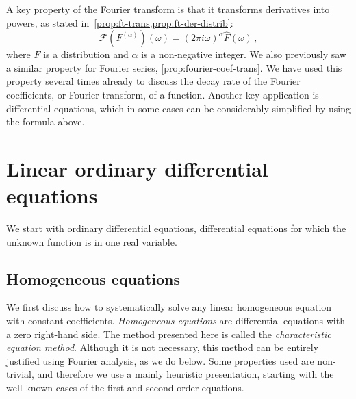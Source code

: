 A key property of the Fourier transform is that it transforms derivatives into powers, as
stated in~\cref{prop:ft-trans,prop:ft-der-distrib}:
\begin{equation}
  \mathcal{F}(F^{(\alpha)})(\omega)=(2\pi i\omega)^{\alpha}\hat{F}(\omega)\,,
\end{equation}
where $F$ is a distribution and $\alpha$ is a non-negative integer. We also previously saw
a similar property for Fourier series, \cf\cref{prop:fourier-coef-trans}. We have used this
property several times already to discuss the decay rate of the Fourier coefficients, or
Fourier transform, of a function. Another key application is differential equations, which
in some cases can be considerably simplified by using the formula above.

\section{Linear ordinary differential equations}
We start with ordinary differential equations, \ie differential equations for which the
unknown function is in one real variable.
\subsection{Homogeneous equations}
We first discuss how to systematically solve any linear homogeneous equation with
constant coefficients. \emph{Homogeneous equations} are differential equations with a
zero right-hand side. The method presented here is called the \emph{characteristic
  equation method}. Although it is not necessary, this method can be entirely justified
using Fourier analysis, as we do below. Some properties used are non-trivial, and
therefore we use a mainly heuristic presentation, starting with the well-known cases of
the first and second-order equations.
